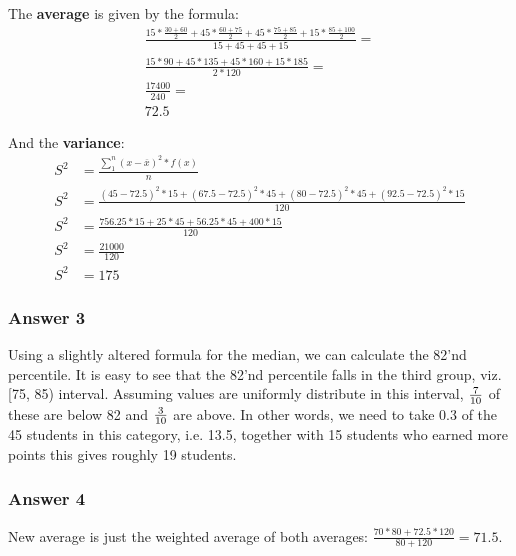 \documentclass[11pt]{article}
\begin{document}
The \textbf{average} is given by the formula:
\begin{equation*}
  \begin{aligned}
    \frac{15 * \frac{30 + 60}{2} + 45 * \frac{60 + 75}{2} +
      45 * \frac{75 + 85}{2} + 15 * \frac{85 + 100}{2}}{15 + 45 + 45 + 15} = \\
    \frac{15 * 90 + 45 * 135 + 45 * 160 + 15 * 185}{2 * 120} = \\
    \frac{17400}{240} = \\72.5
  \end{aligned}
\end{equation*}

And the \textbf{variance}:
\begin{equation*}
  \begin{aligned}
    S^2 &= \frac{\sum_1^n (x - \overline{x})^2 * f(x)}{n} \\
    S^2 &= \frac{(45 - 72.5)^2 * 15 + (67.5 - 72.5)^2 * 45 +
      (80 - 72.5)^2 * 45 + (92.5 - 72.5)^2 * 15}{120} \\
    S^2 &= \frac{756.25 * 15 + 25 * 45 + 56.25 * 45 + 400 * 15}{120} \\
    S^2 &= \frac{21000}{120} \\
    S^2 &= 175
  \end{aligned}
\end{equation*}
\subsubsection{Answer 3}
\label{sec-1-1-3}
Using a slightly altered formula for the median, we can calculate the 82'nd
percentile.  It is easy to see that the 82'nd percentile falls in the third
group, viz. [75, 85) interval.  Assuming values are uniformly distribute
in this interval, ${7 \over 10}$ of these are below 82 and ${3 \over 10}$
are above.  In other words, we need to take 0.3 of the 45 students in this
category, i.e. 13.5, together with 15 students who earned more points this
gives roughly 19 students.
\subsubsection{Answer 4}
\label{sec-1-1-4}
New average is just the weighted average of both averages:
$\frac{70*80+72.5*120}{80+120}=71.5$.
\end{document}
